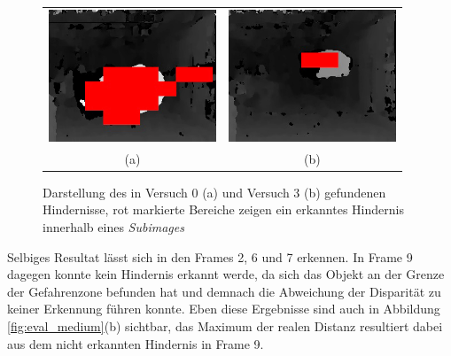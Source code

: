 \begin{figure}[h]
	\centering
	\begin{tabular}{cc}
	\includegraphics[width=5cm]{img/evaluation/medium_test_0_disparity}&
	\includegraphics[width=5cm]{img/evaluation/medium_test_1_disparity}\\
	(a) &  (b)
	\end{tabular}
	\caption{Darstellung des in Versuch 0 (a) und Versuch 3 (b) gefundenen Hindernisse, rot markierte Bereiche zeigen ein erkanntes Hindernis innerhalb eines \emph{Subimages} }
	\label{fig:eval_medium_fails}
\end{figure}

\noindent
Selbiges Resultat lässt sich in den Frames 2, 6 und 7 erkennen. In Frame 9 dagegen konnte kein Hindernis erkannt werde, da sich das Objekt an der Grenze der Gefahrenzone befunden hat und demnach die Abweichung der Disparität zu keiner Erkennung führen konnte. Eben diese Ergebnisse sind auch in Abbildung \ref{fig:eval_medium}(b) sichtbar, das Maximum der realen Distanz resultiert dabei aus dem nicht erkannten Hindernis in Frame 9.\\

